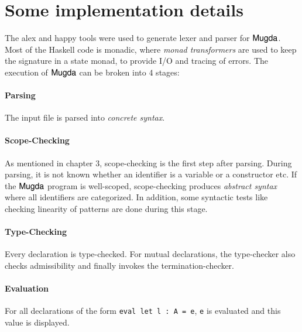 \section{Some implementation details}
The alex \cite{alex} and happy \cite{happy} tools were used to generate lexer and parser for $\textsf{Mugda}$.
Most of the Haskell code is monadic, where \emph{monad transformers} \cite{Grabmueller2006MonadTransformers} are used to keep the signature in a state monad, to provide I/O and tracing of errors. The execution of $\textsf{Mugda}$ can be broken into 4 stages:
\paragraph*{Parsing}
The input file is parsed into \emph{concrete syntax}.
\paragraph*{Scope-Checking}
As mentioned in chapter 3, scope-checking is the first step after parsing.
During parsing, it is not known whether an identifier is a variable or a constructor etc.
If the $\textsf{Mugda}$ program is well-scoped, scope-checking produces \emph{abstract syntax} where all identifiers are categorized. In addition, some syntactic tests like checking linearity of patterns are done during this stage.
\paragraph*{Type-Checking}
Every declaration is type-checked.
For mutual declarations, the type-checker also checks admissibility and finally invokes the termination-checker. 
\paragraph*{Evaluation}
For all declarations of the form \verb+eval let l : A = e+, \verb+e+ is evaluated and this value is displayed.